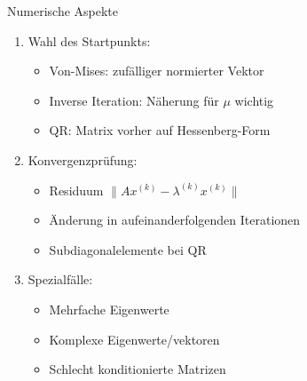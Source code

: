 \begin{KR}{Numerische Aspekte}
\begin{enumerate}
    \item Wahl des Startpunkts:
    \begin{itemize}
        \item Von-Mises: zufälliger normierter Vektor
        \item Inverse Iteration: Näherung für $\mu$ wichtig
        \item QR: Matrix vorher auf Hessenberg-Form
    \end{itemize}
    
    \item Konvergenzprüfung:
    \begin{itemize}
        \item Residuum $\|Ax^{(k)} - \lambda^{(k)}x^{(k)}\|$
        \item Änderung in aufeinanderfolgenden Iterationen
        \item Subdiagonalelemente bei QR
    \end{itemize}
    
    \item Spezialfälle:
    \begin{itemize}
        \item Mehrfache Eigenwerte
        \item Komplexe Eigenwerte/vektoren
        \item Schlecht konditionierte Matrizen
    \end{itemize}
\end{enumerate}
\end{KR}






